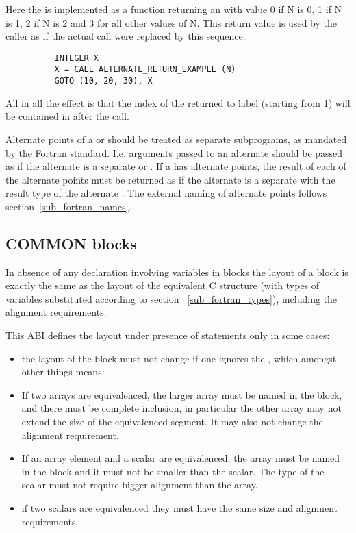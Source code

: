 Here the  is implemented as
a function returning an  with value 0 if N is 0, 1 if N is 1,
2 if N is 2 and 3 for all other values of N.  This return value is used by
the caller as if the actual call were replaced by this sequence:
\begin{footnotesize}
\begin{verbatim}
          INTEGER X
          X = CALL ALTERNATE_RETURN_EXAMPLE (N)
          GOTO (10, 20, 30), X
\end{verbatim}
\end{footnotesize}

All in all the effect is that the index of the returned to label (starting
from 1) will be contained in \RAX after the call.

Alternate  points of a  or 
should be treated as separate subprograms, as mandated by the Fortran
standard.  I.e. arguments passed to an alternate  should be passed
as if the alternate  is a separate  or
.  If a  has alternate  points,
the result of each of the alternate  points must be returned
as if the alternate  is a separate  with the
result type of the alternate .  The external naming of alternate
 points follows section~\ref{sub_fortran_names}.

\subsection{COMMON blocks}
In absence of any  declaration involving variables
in  blocks the layout of a 
 block is exactly the same as the layout of the equivalent C
structure (with types of variables substituted according to section~
\ref{sub_fortran_types}), including the alignment requirements.

This ABI defines the layout under presence of  statements only
in some cases:
\begin{itemize}
\item the layout of the  block must not change if one ignores
      the , which amongst other things means:
\item If two arrays are equivalenced, the larger array must be named in
      the  block, and there must be complete inclusion,
      in particular the other array may not extend the size of the 
      equivalenced segment.  It may also not change the alignment
      requirement.
\item If an array element and a scalar are equivalenced, the array must be
      named in the  block and it must not be smaller than
      the scalar.  The type of the scalar must not require bigger alignment
      than the array.
\item if two scalars are equivalenced they must have the same size and
      alignment requirements.
\end{itemize}

